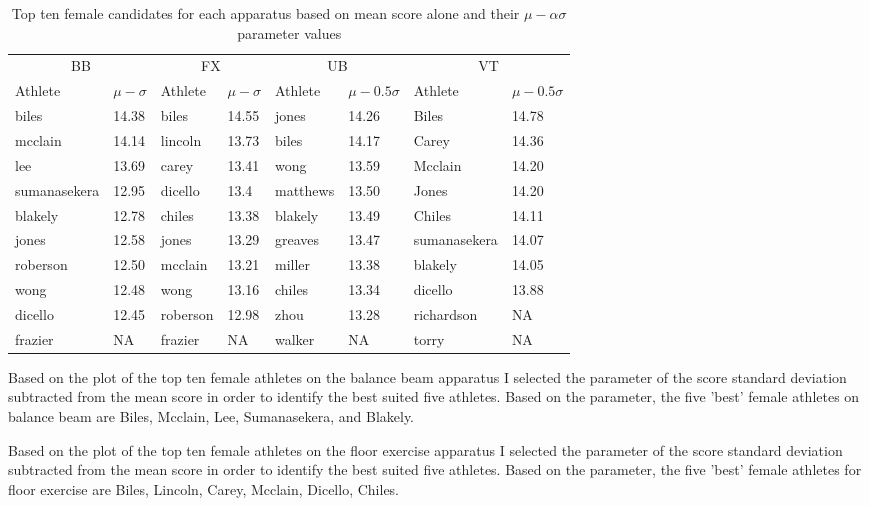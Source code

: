 \documentclass[12pt]{article}
\begin{document}
\begin{table}
  \caption{Top ten female candidates for each apparatus based on mean score alone and 
  their $\mu - \alpha \sigma$ parameter values}
  \label{tab:tableBBP}
\centering
\begin{tabular}[t]{llllllll}
 \toprule
  \multicolumn{2}{c}{BB} & \multicolumn{2}{c}{FX} & \multicolumn{2}{c}{UB} & \multicolumn{2}{c}{VT}\\
  \cmidrule(lr){1-2}\cmidrule(lr){3-4}\cmidrule(lr){5-6}\cmidrule(lr){7-8}
Athlete & $\mu - \sigma$ & Athlete & $\mu - \sigma$ & Athlete & $\mu - 0.5 \sigma$ & Athlete & $\mu - 0.5 \sigma$\\
\midrule
biles & 14.38 & biles & 14.55 & jones & 14.26 & Biles & 14.78\\
\midrule
mcclain & 14.14 & lincoln & 13.73 & biles & 14.17 & Carey & 14.36\\
\midrule
lee & 13.69 & carey & 13.41 & wong & 13.59 & Mcclain & 14.20\\
\midrule
sumanasekera & 12.95 & dicello & 13.4 & matthews & 13.50 & Jones & 14.20\\
\midrule
blakely & 12.78 & chiles & 13.38 & blakely & 13.49 & Chiles & 14.11\\
\midrule
jones & 12.58 & jones & 13.29 & greaves & 13.47 & sumanasekera & 14.07\\
\midrule
roberson & 12.50 & mcclain & 13.21 & miller & 13.38 & blakely & 14.05\\
\midrule
wong & 12.48 & wong & 13.16 & chiles & 13.34 & dicello & 13.88\\
\midrule
dicello & 12.45 & roberson & 12.98 & zhou & 13.28 & richardson & NA\\
\midrule
frazier & NA & frazier & NA & walker & NA & torry & NA\\
\bottomrule
\end{tabular}
\end{table}

Based on the plot of the top ten female athletes on the balance beam apparatus I selected the parameter of 
the score standard deviation subtracted from the mean score in order to identify the best suited five 
athletes. Based on the parameter, the five 'best' female athletes on balance beam are Biles, Mcclain, 
Lee, Sumanasekera, and Blakely.



Based on the plot of the top ten female athletes on the floor exercise apparatus I selected the parameter of 
the score standard deviation subtracted from the mean score in order to identify the best suited five 
athletes. Based on the parameter, the five 'best' female athletes for floor exercise are Biles, Lincoln, Carey, 
Mcclain, Dicello, Chiles.
\end{document}
